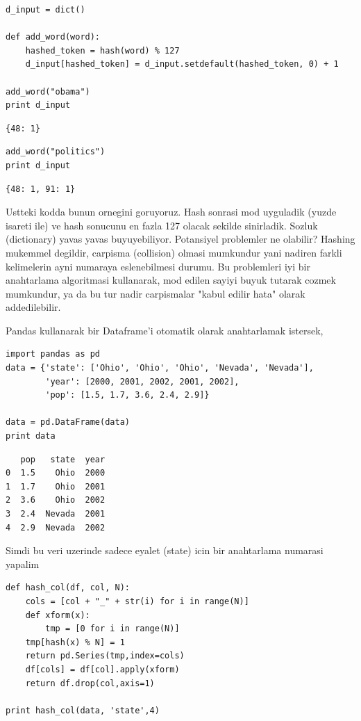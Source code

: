 \documentclass[12pt,fleqn]{article}\usepackage{../common}
\begin{document}
\begin{verbatim}
d_input = dict()

def add_word(word):
    hashed_token = hash(word) % 127
    d_input[hashed_token] = d_input.setdefault(hashed_token, 0) + 1

add_word("obama")
print d_input
\end{verbatim}

\begin{verbatim}
{48: 1}
\end{verbatim}

\begin{verbatim}
add_word("politics")
print d_input
\end{verbatim}

\begin{verbatim}
{48: 1, 91: 1}
\end{verbatim}

Ustteki kodda bunun ornegini goruyoruz. Hash sonrasi mod uyguladik
(yuzde isareti ile) ve hash sonucunu en fazla 127 olacak sekilde
sinirladik. Sozluk (dictionary) yavas yavas buyuyebiliyor.
Potansiyel problemler ne olabilir? Hashing mukemmel degildir, carpisma
(collision) olmasi mumkundur yani nadiren farkli kelimelerin ayni
numaraya eslenebilmesi durumu. Bu problemleri iyi bir anahtarlama
algoritmasi kullanarak, mod edilen sayiyi buyuk tutarak cozmek
mumkundur, ya da bu tur nadir carpismalar "kabul edilir hata" olarak
addedilebilir.

Pandas kullanarak bir Dataframe'i otomatik olarak anahtarlamak istersek,

\begin{verbatim}
import pandas as pd
data = {'state': ['Ohio', 'Ohio', 'Ohio', 'Nevada', 'Nevada'],
        'year': [2000, 2001, 2002, 2001, 2002],
        'pop': [1.5, 1.7, 3.6, 2.4, 2.9]}

data = pd.DataFrame(data)
print data
\end{verbatim}

\begin{verbatim}
   pop   state  year
0  1.5    Ohio  2000
1  1.7    Ohio  2001
2  3.6    Ohio  2002
3  2.4  Nevada  2001
4  2.9  Nevada  2002
\end{verbatim}

Simdi bu veri uzerinde sadece eyalet (state) icin bir anahtarlama numarasi
yapalim

\begin{verbatim}
def hash_col(df, col, N):
    cols = [col + "_" + str(i) for i in range(N)]
    def xform(x):
        tmp = [0 for i in range(N)]
	tmp[hash(x) % N] = 1
	return pd.Series(tmp,index=cols)
    df[cols] = df[col].apply(xform)
    return df.drop(col,axis=1)

print hash_col(data, 'state',4)
\end{verbatim}
\end{document}
